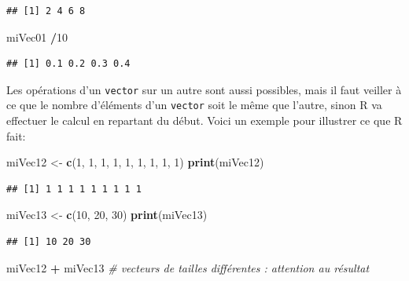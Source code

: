 \documentclass[]{book}
\newenvironment{Shaded}{\begin{snugshade}}{\end{snugshade}}
\newcommand{\CommentTok}[1]{\textcolor[rgb]{0.56,0.35,0.01}{\textit{#1}}}
\newcommand{\DecValTok}[1]{\textcolor[rgb]{0.00,0.00,0.81}{#1}}
\newcommand{\KeywordTok}[1]{\textcolor[rgb]{0.13,0.29,0.53}{\textbf{#1}}}
\newcommand{\NormalTok}[1]{#1}
\newcommand{\OperatorTok}[1]{\textcolor[rgb]{0.81,0.36,0.00}{\textbf{#1}}}
\newcommand{\StringTok}[1]{\textcolor[rgb]{0.31,0.60,0.02}{#1}}
\begin{document}
\begin{verbatim}
## [1] 2 4 6 8
\end{verbatim}

\begin{Shaded}
\begin{Highlighting}[]
\NormalTok{miVec01 }\OperatorTok{/}\DecValTok{10}
\end{Highlighting}
\end{Shaded}

\begin{verbatim}
## [1] 0.1 0.2 0.3 0.4
\end{verbatim}

Les opérations d'un \texttt{vector} sur un autre sont aussi possibles, mais il faut veiller à ce que le nombre d'éléments d'un \texttt{vector} soit le même que l'autre, sinon R va effectuer le calcul en repartant du début. Voici un exemple pour illustrer ce que R fait:

\begin{Shaded}
\begin{Highlighting}[]
\NormalTok{miVec12 <-}\StringTok{ }\KeywordTok{c}\NormalTok{(}\DecValTok{1}\NormalTok{, }\DecValTok{1}\NormalTok{, }\DecValTok{1}\NormalTok{, }\DecValTok{1}\NormalTok{, }\DecValTok{1}\NormalTok{, }\DecValTok{1}\NormalTok{, }\DecValTok{1}\NormalTok{, }\DecValTok{1}\NormalTok{, }\DecValTok{1}\NormalTok{)}
\KeywordTok{print}\NormalTok{(miVec12)}
\end{Highlighting}
\end{Shaded}

\begin{verbatim}
## [1] 1 1 1 1 1 1 1 1 1
\end{verbatim}

\begin{Shaded}
\begin{Highlighting}[]
\NormalTok{miVec13 <-}\StringTok{ }\KeywordTok{c}\NormalTok{(}\DecValTok{10}\NormalTok{, }\DecValTok{20}\NormalTok{, }\DecValTok{30}\NormalTok{)}
\KeywordTok{print}\NormalTok{(miVec13)}
\end{Highlighting}
\end{Shaded}

\begin{verbatim}
## [1] 10 20 30
\end{verbatim}

\begin{Shaded}
\begin{Highlighting}[]
\NormalTok{miVec12 }\OperatorTok{+}\StringTok{ }\NormalTok{miVec13 }\CommentTok{# vecteurs de tailles différentes : attention au résultat}
\end{Highlighting}
\end{Shaded}
\end{document}
